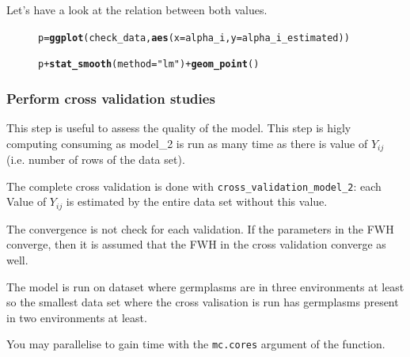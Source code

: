 \documentclass{book}\usepackage[]{graphicx}\usepackage[]{color}
\makeatletter
\newcommand{\hlstr}[1]{\textcolor[rgb]{0.192,0.494,0.8}{#1}}%
\newcommand{\hlopt}[1]{\textcolor[rgb]{0,0,0}{#1}}%
\newcommand{\hlstd}[1]{\textcolor[rgb]{0.345,0.345,0.345}{#1}}%
\newcommand{\hlkwb}[1]{\textcolor[rgb]{0.69,0.353,0.396}{#1}}%
\newcommand{\hlkwc}[1]{\textcolor[rgb]{0.333,0.667,0.333}{#1}}%
\newcommand{\hlkwd}[1]{\textcolor[rgb]{0.737,0.353,0.396}{\textbf{#1}}}%
\newenvironment{kframe}{%
 \def\at@end@of@kframe{}%
 \ifinner\ifhmode%
  \def\at@end@of@kframe{\end{minipage}}%
  \begin{minipage}{\columnwidth}%
 \fi\fi%
 \def\FrameCommand##1{\hskip\@totalleftmargin \hskip-\fboxsep
 \colorbox{shadecolor}{##1}\hskip-\fboxsep
     \hskip-\linewidth \hskip-\@totalleftmargin \hskip\columnwidth}%
 \MakeFramed {\advance\hsize-\width
   \@totalleftmargin\z@ \linewidth\hsize
   \@setminipage}}%
 {\par\unskip\endMakeFramed%
 \at@end@of@kframe}
\newenvironment{knitrout}{}{} %
\makeatother
\begin{document}
Let’s have a look at the relation between both values.

\begin{figure}[H]
\begin{knitrout}
\color{fgcolor}\begin{kframe}
\begin{alltt}
\hlstd{p} \hlkwb{=} \hlkwd{ggplot}\hlstd{(check_data,} \hlkwd{aes}\hlstd{(}\hlkwc{x} \hlstd{= alpha_i,} \hlkwc{y} \hlstd{= alpha_i_estimated))}
\end{alltt}


{\ttfamily\noindent\bfseries\color{errorcolor}{\#\# Error in ggplot(check\_data, aes(x = alpha\_i, y = alpha\_i\_estimated)): objet 'check\_data' introuvable}}\begin{alltt}
\hlstd{p} \hlopt{+} \hlkwd{stat_smooth}\hlstd{(}\hlkwc{method} \hlstd{=} \hlstr{"lm"}\hlstd{)} \hlopt{+} \hlkwd{geom_point}\hlstd{()}
\end{alltt}


{\ttfamily\noindent\bfseries\color{errorcolor}{\#\# Error in eval(expr, envir, enclos): objet 'p' introuvable}}\end{kframe}
\end{knitrout}
\end{figure}



\subsubsection{Perform cross validation studies}

This step is useful to assess the quality of the model.
This step is higly computing consuming as model\_2 is run as many time as there is value of $Y_{ij}$ (i.e. number of rows of the data set).

The complete cross validation is done with \texttt{cross\_validation\_model\_2}: 
each Value of $Y_{ij}$ is estimated by the entire data set without this value.

The convergence is not check for each validation. 
If the parameters in the FWH converge, then it is assumed that the FWH in the cross validation converge as well.

The model is run on dataset where germplasms are in three environments at least so the smallest data set where the cross valisation is run has germplasms present in two environments at least. 

You may parallelise to gain time with the \texttt{mc.cores} argument of the function.
\end{document}
